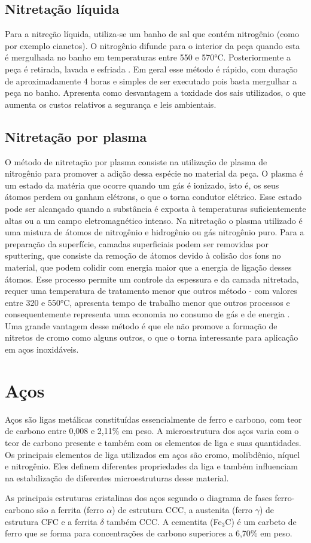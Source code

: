 \documentclass[]{politex}
\begin{document}
\subsection{Nitretação líquida}
	Para a nitreção líquida, utiliza-se um banho de sal que contém nitrogênio (como por exemplo cianetos). O nitrogênio difunde para o interior da peça quando esta é mergulhada no banho em temperaturas entre 550 e 570°C. Posteriormente a peça é retirada, lavada e esfriada \cite{zimmermannnitretaccao}. 
	Em geral esse método é rápido, com duração de aproximadamente 4 horas e simples de ser executado pois basta mergulhar a peça no banho. Apresenta como desvantagem a toxidade dos sais utilizados, o que aumenta os custos relativos a segurança e leis ambientais.
	
\subsection{Nitretação por plasma}
	O método de nitretação por plasma consiste na utilização de plasma de nitrogênio para promover a adição dessa espécie no material da peça. 
	O plasma é um estado da matéria que ocorre quando um gás é ionizado, isto é, os seus átomos perdem ou ganham elétrons, o que o torna condutor elétrico. Esse estado pode ser alcançado quando a substância é exposta à temperaturas suficientemente altas ou a um campo eletromagnético intenso. Na nitretação o plasma utilizado é uma mistura de átomos de nitrogênio e hidrogênio ou gás nitrogênio puro.
	Para a preparação da superfície, camadas superficiais podem ser removidas por sputtering, que consiste da remoção de átomos devido à colisão dos íons no material, que podem colidir com energia maior que a energia de ligação desses átomos.
	 Esse processo permite um controle da espessura e da camada nitretada, requer uma temperatura de tratamento menor que outros método - com valores entre 320 e 550°C, apresenta tempo de trabalho menor que outros processos e consequentemente representa uma economia no consumo de gás e de energia \cite{zimmermannnitretaccao}. 
	Uma grande vantagem desse método é que ele não promove a formação de nitretos de cromo como alguns outros, o que o torna interessante para aplicação em aços inoxidáveis.
	
\section{Aços}
	Aços são ligas metálicas constituídas essencialmente de ferro e carbono, com teor de carbono entre 0,008 e 2,11\% em peso. A microestrutura dos aços varia com o teor de carbono presente e também com os elementos de liga e suas quantidades. Os principais elementos de liga utilizados em aços são cromo, molibdênio, níquel e nitrogênio. Eles definem diferentes propriedades da liga e também influenciam na estabilização de diferentes microestruturas desse material. \par
	As principais estruturas cristalinas dos aços segundo o diagrama de fases ferro-carbono são a ferrita (ferro $\alpha$) de estrutura CCC, a austenita (ferro $\gamma$) de estrutura CFC e a ferrita $\delta$ também CCC. A cementita (Fe$_{3}$C) é um carbeto de ferro que se forma para concentrações de carbono superiores a 6,70\% em peso.
	
\end{document}
